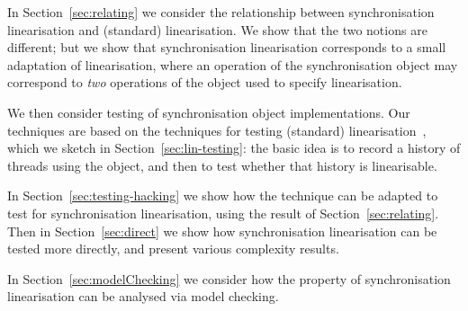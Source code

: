 In Section~\ref{sec:relating} we consider the relationship between
synchronisation linearisation and (standard) linearisation.  We show that the
two notions are different; but we show that synchronisation linearisation
corresponds to a small adaptation of linearisation, where an
operation of the synchronisation object may correspond to \emph{two} operations
of the object used to specify linearisation.  

We then consider testing of synchronisation object implementations.  Our
techniques are based on the techniques for testing (standard)
linearisation~\cite{gavin:lin-testing}, which we sketch in
Section~\ref{sec:lin-testing}: the basic idea is to record a history of
threads using the object, and then to test whether that history is
linearisable.

In Section~\ref{sec:testing-hacking} we show
how the technique can be adapted to test for synchronisation linearisation,
using the result of Section~\ref{sec:relating}.  Then in
Section~\ref{sec:direct} we show how synchronisation linearisation can be
tested more directly, and present various complexity results.   

In Section~\ref{sec:modelChecking} we consider how the property of
synchronisation linearisation can be analysed via model checking.

